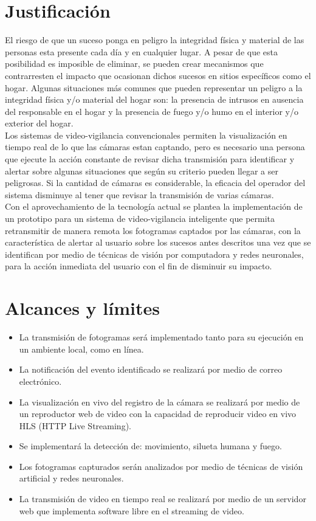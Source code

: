 \section{Justificación}
El riesgo de que un suceso ponga en peligro la integridad física y material de las personas esta presente cada día y en cualquier lugar. A pesar de que esta posibilidad es imposible de eliminar, se pueden crear mecanismos que contrarresten el impacto que ocasionan dichos sucesos en sitios específicos como el hogar. Algunas situaciones más comunes que pueden representar un peligro a la integridad física y/o material del hogar son: la presencia de intrusos en ausencia del responsable en el hogar y la presencia de fuego y/o humo en el interior y/o exterior del hogar.\\

Los sistemas de video-vigilancia convencionales permiten la visualización en tiempo real de lo que las cámaras estan captando, pero es necesario una persona que ejecute la acción constante de revisar dicha transmisión para identificar y alertar sobre algunas situaciones que según su criterio pueden llegar a ser peligrosas. Si la cantidad de cámaras es considerable, la eficacia del operador del sistema disminuye al tener que revisar la transmisión de varias cámaras.\\

Con el aprovechamiento de la tecnología actual se plantea la implementación de un prototipo para un sistema de video-vigilancia inteligente que permita retransmitir de manera remota los fotogramas captados por las cámaras, con la característica de alertar al usuario sobre los sucesos antes descritos una vez que se identifican por medio de técnicas de visión por computadora y redes neuronales, para la acción inmediata del usuario con el fin de disminuir su impacto.\\

\section{Alcances y límites}
\begin{itemize}
    \item La transmisión de fotogramas será implementado tanto para su ejecución en un ambiente local, como en línea.
    \item La notificación del evento identificado se realizará por medio de correo electrónico.
    \item La visualización en vivo del registro de la cámara se realizará por medio de un reproductor web de video con la capacidad de reproducir video en vivo HLS (HTTP Live Streaming).
    \item Se implementará la detección de: movimiento, silueta humana y fuego.
    \item Los fotogramas capturados serán analizados por medio de técnicas de visión artificial y redes neuronales.
    \item La transmisión de video en tiempo real se realizará por medio de un servidor web que implementa software libre en el streaming de video.
\end{itemize}
